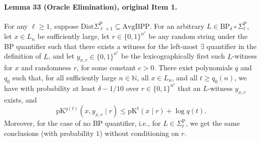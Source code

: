 \paragraph{Lemma 33 (Oracle Elimination), original Item 1.} For any $\ell\geq1$, suppose $\mathrm{Dist}\Sigma_{\ell+1}^{\mathrm P}\subseteq\mathrm{AvgBPP}$. For an arbitrary $L\in\mathrm{BP}_\delta\circ\Sigma_\ell^{\mathrm P}$, let $x\in L_n$ be sufficiently large, let $r\in\{0,1\}^{n^c}$ be any random string under the BP quantifier such that there exists a witness for the left-most $\exists$ quantifier in the definition of $L$, and let $y_{x,r}\in\{0,1\}^{n^c}$ be the lexicographically first such $L$-witness for $x$ and randomness $r$, for some constant $c>0$.
There exist polynomials $q$ and $q_0$ such that, for all sufficiently large $n\in\mathbb N$, all $x\in L_n$, and all $t\geq q_0(n)$, we have with probability at least $\delta-1/10$ over $r\in\{0,1\}^{n^c}$ that an $L$-witness $y_{x,r}$ exists, and
\[\mathrm{pK}^{q(t)}(x,y_{x,r}\mid r)\leq\mathrm{pK}^t(x\mid r)+\log q(t).\]
Moreover, for the case of no BP quantifier, i.e., for $L\in\Sigma_\ell^{\mathrm P}$, we get the same conclusions (with probability $1$) without conditioning on $r$.
